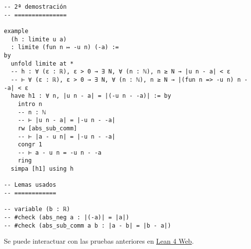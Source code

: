 \begin{verbatim}
-- 2ª demostración
-- ===============

example
  (h : limite u a)
  : limite (fun n ↦ -u n) (-a) :=
by
  unfold limite at *
  -- h : ∀ (ε : ℝ), ε > 0 → ∃ N, ∀ (n : ℕ), n ≥ N → |u n - a| < ε
  -- ⊢ ∀ (ε : ℝ), ε > 0 → ∃ N, ∀ (n : ℕ), n ≥ N → |(fun n => -u n) n - -a| < ε
  have h1 : ∀ n, |u n - a| = |(-u n - -a)| := by
    intro n
    -- n : ℕ
    -- ⊢ |u n - a| = |-u n - -a|
    rw [abs_sub_comm]
    -- ⊢ |a - u n| = |-u n - -a|
    congr 1
    -- ⊢ a - u n = -u n - -a
    ring
  simpa [h1] using h

-- Lemas usados
-- ============

-- variable (b : ℝ)
-- #check (abs_neg a : |(-a)| = |a|)
-- #check (abs_sub_comm a b : |a - b| = |b - a|)
\end{verbatim}
Se puede interactuar con las pruebas anteriores en \href{https://lean.math.hhu.de/\#url=https://raw.githubusercontent.com/jaalonso/Calculemus2/main/src/Limite\_de\_la\_opuesta.lean}{Lean 4 Web}.



